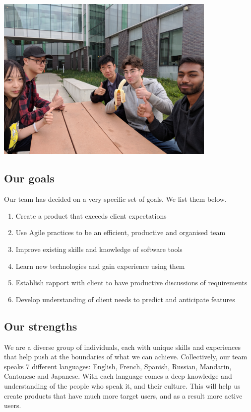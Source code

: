 \documentclass[12pt]{scrreprt}
\begin{document}
\begin{center}
	\includegraphics[width=0.8\textwidth]{food2.jpg}
\end{center}

\subsection{Our goals}
Our team has decided on a very specific set of goals. We list them below.
\begin{enumerate}
	\item Create a product that exceeds client expectations
	\item Use Agile practices to be an efficient, productive and organised team
	\item Improve existing skills and knowledge of software tools
	\item Learn new technologies and gain experience using them
	\item Establish rapport with client to have productive discussions of requirements
	\item Develop understanding of client needs to predict and anticipate features
\end{enumerate}

\subsection{Our strengths}
We are a diverse group of individuals, each with unique skills and experiences that help push at the boundaries of what we can achieve. Collectively, our team speaks 7 different languages: English, French, Spanish, Russian, Mandarin, Cantonese and Japanese. With each language comes a deep knowledge and understanding of the people who speak it, and their culture. This will help us create products that have much more target users, and as a result more active users.
\end{document}
